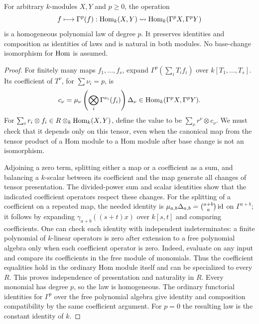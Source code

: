 \begin{proposition}\label{prop:gamma-hom-law}
For arbitrary $k$-modules $X,Y$ and $p\ge0$, the operation
\[
 f\longmapsto\Gamma^p(f):
 \operatorname{Hom}_k(X,Y)\rightsquigarrow
 \operatorname{Hom}_k(\Gamma^pX,\Gamma^pY)
\]
is a homogeneous polynomial law of degree $p$. It preserves identities
and composition as identities of laws and is natural in both modules.
No base-change isomorphism for $\operatorname{Hom}$ is assumed.
\end{proposition}
\begin{proof}
For finitely many maps $f_1,\ldots,f_s$, expand
$\Gamma^p(\sum_iT_if_i)$ over $k[T_1,\ldots,T_s]$.
Its coefficient of $T^\nu$, for $\sum\nu_i=p$, is
\[
 c_\nu=\mu_\nu\left(\bigotimes_i\Gamma^{\nu_i}(f_i)\right)
          \Delta_\nu
 \in\operatorname{Hom}_k(\Gamma^pX,\Gamma^pY).
\]
For $\sum_i r_i\otimes f_i\in R\otimes_k\operatorname{Hom}_k(X,Y)$,
define the value to be $\sum_\nu r^\nu\otimes c_\nu$.
We must check that it depends only on this tensor, even when the
canonical map from the tensor product of a Hom module to a Hom module
after base change is not an isomorphism.

Adjoining a zero term, splitting either a map or a coefficient as
a sum, and balancing a $k$-scalar between its coefficient and the map generate all changes
of tensor presentation. The divided-power sum and scalar identities
show that the indicated coefficient operators respect these changes.
For the splitting of a coefficient on a repeated map, the needed
identity is $\mu_{a,b}\Delta_{a,b}=\binom{a+b}{a}\operatorname{id}$ on
$\Gamma^{a+b}$; it follows by expanding $\gamma_{a+b}((s+t)x)$
over $k[s,t]$ and comparing coefficients.
One can check each identity with independent indeterminates: a finite
polynomial of $k$-linear operators is zero after extension to a free
polynomial algebra only when each coefficient operator is zero.
Indeed, evaluate on any input and compare its coefficients in the
free module of monomials. Thus the coefficient equalities hold in
the ordinary Hom module itself and can be specialized to every $R$.
This proves independence of presentation and naturality in $R$.
Every monomial has degree $p$, so the law is homogeneous.
The ordinary functorial identities for $\Gamma^p$ over the free
polynomial algebra give identity and composition compatibility by
the same coefficient argument. For $p=0$ the resulting law is the
constant identity of $k$.
\end{proof}

